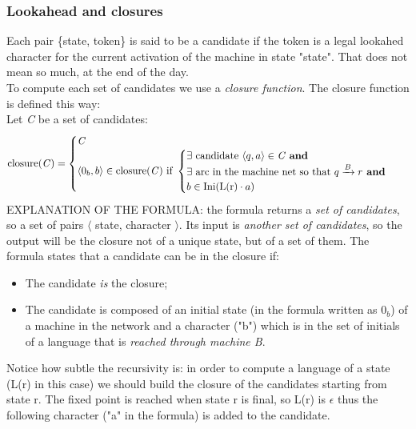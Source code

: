 			\subsubsection{Lookahead and closures}
				Each pair \{state, token\} is said to be a candidate if the token is a legal lookahed character for the current activation of the machine in state "state". That does not mean so much, at the end of the day.\\
				To compute each set of candidates we use a \emph{closure function}. The closure function is defined this way:\\
				Let \emph{C} be a set of candidates:
				\begin{equation}
					\text{closure(\emph{C})} =
					\begin{cases}
				  		\text{\emph{C}} \\
				  		\langle 0_b, b \rangle \in \text{closure(\emph{C}) if }
				  		\begin{cases}
				  			\exists \text{ candidate } \langle q, a\rangle \in \text{\emph{C} \textbf{and}}\\
				  			\exists \text{ arc in the machine net so that } q \xrightarrow{B} r \text{\textbf{ and}}\\
				  			b \in \text{Ini(L(r)} \cdot a \text{)}
				  		\end{cases} 
					\end{cases}
			  	\end{equation}
			  	EXPLANATION OF THE FORMULA: the formula returns a \emph{set of candidates}, so a set of pairs $\langle$ state, character $\rangle$. Its input is \emph{another set of candidates}, so the output will be the closure not of a unique state, but of a set of them. The formula states that a candidate can be in the closure if:
			  	\begin{itemize}
			  		\item The candidate \emph{is} the closure;
			  		\item The candidate is composed of an initial state (in the formula written as $0_b$) of a machine in the network and a character ("b") which is in the set of initials of a language that is \emph{reached through machine B}.
			  	\end{itemize}
			  	Notice how subtle the recursivity is: in order to compute a language of a state (L(r) in this case) we should build the closure of the candidates starting from state r. The fixed point is reached when state r is final, so L(r) is $\epsilon$ thus the following character ("a" in the formula) is added to the candidate.
			
